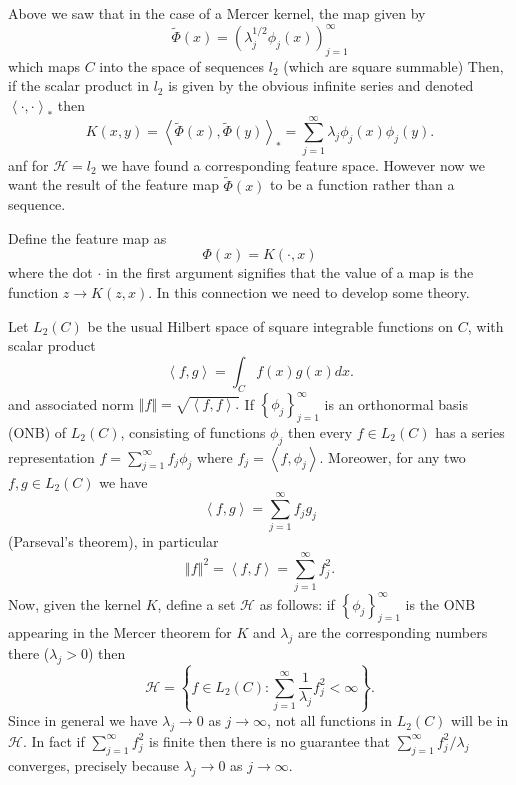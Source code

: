 \documentclass[11pt,twoside]{article}%
\theoremstyle{change}
\begin{document}
Above we saw that in the case of a Mercer kernel, the map given by
\[
\tilde{\Phi}(x)=\left(  \lambda_{j}^{1/2}\phi_{j}(x)\right)  _{j=1}^{\infty}%
\]
which maps $C$ into the space of sequences $l_{2}$ (which are square summable)
Then, if the scalar product in $l_{2}$ is given by the obvious infinite series
and denoted $\left\langle \cdot,\cdot\right\rangle _{\ast} $ then
\[
K(x,y)=\left\langle \tilde{\Phi}(x),\tilde{\Phi}(y)\right\rangle _{\ast}%
=\sum_{j=1}^{\infty}\lambda_{j}\phi_{j}(x)\phi_{j}(y).
\]
anf for $\mathcal{H=}l_{2}$ we have found a corresponding feature space.
However now we want the result of the feature map $\tilde{\Phi}(x)$ to be a
function rather than a sequence.

Define the feature map as
\[
\Phi(x)=K(\cdot,x)
\]
where the dot $\cdot$ in the first argument signifies that the value of a map
is the function $z\rightarrow K(z,x)$. In this connection we need to develop
some theory.

Let $L_{2}(C)$ be the usual Hilbert space of square integrable functions on
$C$, with scalar product
\[
\left\langle f,g\right\rangle =\int_{C}f(x)g(x)dx.
\]
and associated norm $\left\Vert f\right\Vert =\sqrt{\left\langle
f,f\right\rangle .}$ If $\left\{  \phi_{j}\right\}  _{j=1}^{\infty}$ is an
orthonormal basis (ONB) of $L_{2}(C)$, consisting of functions $\phi_{j}$ then
every $f\in L_{2}(C)$ has a series representation $f=\sum_{j=1}^{\infty}%
f_{j}\phi_{j}$ where $f_{j}=\left\langle f,\phi_{j}\right\rangle $. Moreower,
for any two $f,g\in L_{2}(C)$ we have
\[
\left\langle f,g\right\rangle =\sum_{j=1}^{\infty}f_{j}g_{j}%
\]
(Parseval's theorem), in particular
\[
\left\Vert f\right\Vert ^{2}=\left\langle f,f\right\rangle =\sum_{j=1}%
^{\infty}f_{j}^{2}.
\]
Now, given the kernel $K$, define a set $\mathcal{H}$ as follows: if $\left\{
\phi_{j}\right\}  _{j=1}^{\infty}$ is the ONB appearing in the Mercer theorem
for $K$ and $\lambda_{j}$ are the corresponding numbers there ($\lambda_{j}%
>0$) then
\[
\mathcal{H=}\left\{  f\in L_{2}(C):\sum_{j=1}^{\infty}\frac{1}{\lambda_{j}%
}f_{j}^{2}<\infty\right\}  .
\]
Since in general we have $\lambda_{j}\rightarrow0$ as $j\rightarrow\infty$,
not all functions in $L_{2}(C)$ will be in $\mathcal{H}$. In fact if
$\sum_{j=1}^{\infty}f_{j}^{2}$ is finite then there is no guarantee that
$\sum_{j=1}^{\infty}f_{j}^{2}/\lambda_{j}$ converges, precisely because
$\lambda_{j}\rightarrow0$ as $j\rightarrow\infty$.
\end{document}
